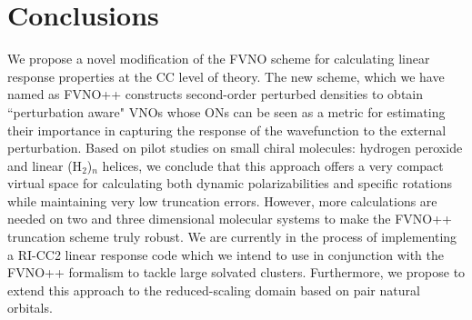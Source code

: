 \section{Conclusions}
We propose a novel modification of the FVNO scheme for calculating linear
response properties at the CC level of theory. The new scheme, which we have named
as FVNO++ constructs second-order perturbed densities to obtain ``perturbation
aware" VNOs whose ONs can be seen as a metric for estimating 
their importance in capturing the response of the wavefunction to the external 
perturbation. Based on pilot studies on small chiral molecules: hydrogen peroxide 
and linear (H$_2$)$_n$ helices, we conclude that this approach offers a very compact 
virtual space for calculating both dynamic polarizabilities and specific rotations
while maintaining very low truncation errors. However, more calculations are 
needed on two and three dimensional molecular systems to make the FVNO++ truncation 
scheme truly robust. We are currently in the process of implementing a RI-CC2 linear 
response code\cite{Friese12} which we intend to use in conjunction with the FVNO++ formalism 
to tackle large solvated clusters. Furthermore, we propose to extend this approach 
to the reduced-scaling domain based on pair natural orbitals\cite{NeeseCCSD09,Neese09}.

